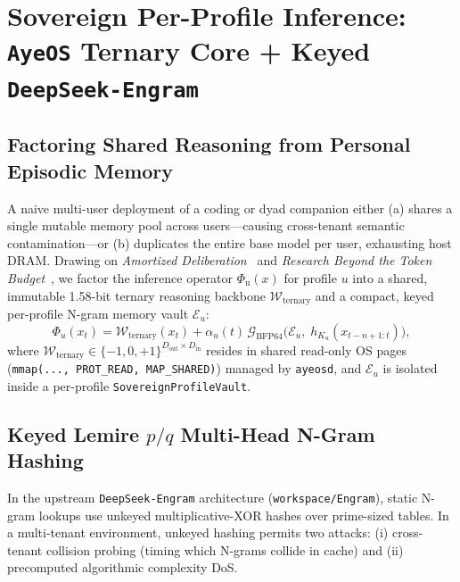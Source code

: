 \documentclass[10pt,twocolumn,letterpaper]{article}
\begin{document}
\section{Sovereign Per-Profile Inference: \texttt{AyeOS} Ternary Core + Keyed \texttt{DeepSeek-Engram}}

\subsection{Factoring Shared Reasoning from Personal Episodic Memory}
A naive multi-user deployment of a coding or dyad companion either (a) shares a single mutable memory pool across users---causing cross-tenant semantic contamination---or (b) duplicates the entire base model per user, exhausting host DRAM. Drawing on \emph{Amortized Deliberation}~\cite{guimond2026amortized} and \emph{Research Beyond the Token Budget}~\cite{guimond2026tokenbudget}, we factor the inference operator $\Phi_{\text{u}}(x)$ for profile $u$ into a shared, immutable 1.58-bit ternary reasoning backbone $\mathcal{W}_{\text{ternary}}$ and a compact, keyed per-profile N-gram memory vault $\mathcal{E}_{u}$:
\begin{equation}
    \Phi_{u}(x_t) = \mathcal{W}_{\text{ternary}}(x_t) + \alpha_{u}(t)\,\mathcal{G}_{\text{BFP64}}\!\bigl(\mathcal{E}_{u},\; h_{K_u}(x_{t-n+1:t})\bigr),
\end{equation}
where $\mathcal{W}_{\text{ternary}} \in \{-1, 0, +1\}^{D_{\text{out}} \times D_{\text{in}}}$ resides in shared read-only OS pages (\texttt{mmap(..., PROT\_READ, MAP\_SHARED)}) managed by \texttt{ayeosd}, and $\mathcal{E}_{u}$ is isolated inside a per-profile \texttt{SovereignProfileVault}.

\subsection{Keyed Lemire $p/q$ Multi-Head N-Gram Hashing}
In the upstream \texttt{DeepSeek-Engram} architecture (\texttt{workspace/Engram}), static N-gram lookups use unkeyed multiplicative-XOR hashes over prime-sized tables. In a multi-tenant environment, unkeyed hashing permits two attacks: (i) cross-tenant collision probing (timing which N-grams collide in cache) and (ii) precomputed algorithmic complexity DoS.
\end{document}
